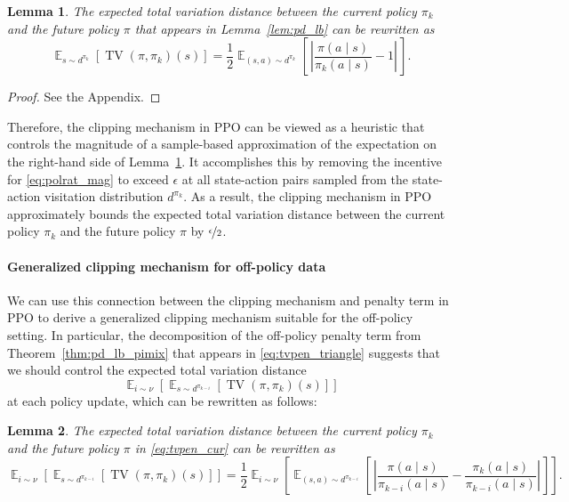 \documentclass{article}
\newtheorem{lemma}{Lemma}
\begin{document}
\begin{lemma}\label{lem:tv_polrat_pik}
The expected total variation distance between the current policy $\pi_k$ and the future policy $\pi$ that appears in Lemma~\ref{lem:pd_lb} can be rewritten as
\begin{equation}
\mathop{\mathbb{E}}_{s \sim d^{\pi_k}} \left[ \operatorname{TV}(\pi,\pi_k)(s) \right] = \frac{1}{2} \mathop{\mathbb{E}}_{(s,a) \sim d^{\pi_k}} \left[ \, \left| \frac{\pi(a \mid s)}{\pi_k(a \mid s)} - 1  \right| \, \right].
\end{equation}
\end{lemma}

\begin{proof}
See the Appendix.
\end{proof}

Therefore, the clipping mechanism in PPO can be viewed as a heuristic that controls the magnitude of a sample-based approximation of the expectation on the right-hand side of Lemma~\ref{lem:tv_polrat_pik}. It accomplishes this by removing the incentive for \eqref{eq:polrat_mag} to exceed $\epsilon$ at all state-action pairs sampled from the state-action visitation distribution $d^{\pi_k}$. As a result, the clipping mechanism in PPO approximately bounds the expected total variation distance between the current policy $\pi_k$ and the future policy $\pi$ by $\nicefrac{\epsilon}{2}$.

\paragraph{Generalized clipping mechanism for off-policy data}

We can use this connection between the clipping mechanism and penalty term in PPO to derive a generalized clipping mechanism suitable for the off-policy setting. In particular, the decomposition of the off-policy penalty term from Theorem~\ref{thm:pd_lb_pimix} that appears in \eqref{eq:tvpen_triangle} suggests that we should control the expected total variation distance
\begin{equation}\label{eq:tvpen_cur}
\mathop{\mathbb{E}}_{i \sim \nu} \left[ \mathop{\mathbb{E}}_{s \sim d^{\pi_{k-i}}} \left[ \operatorname{TV}(\pi,\pi_{k})(s) \right] \right]
\end{equation}
at each policy update, which can be rewritten as follows:

\begin{lemma}\label{lem:tv_polrat_pimix}
The expected total variation distance between the current policy $\pi_k$ and the future policy $\pi$ in \eqref{eq:tvpen_cur} can be rewritten as
\begin{equation}
\mathop{\mathbb{E}}_{i \sim \nu} \left[ \mathop{\mathbb{E}}_{s \sim d^{\pi_{k-i}}} \left[ \operatorname{TV}(\pi,\pi_{k})(s) \right] \right] = \frac{1}{2} \mathop{\mathbb{E}}_{i \sim \nu} \left[ \mathop{\mathbb{E}}_{(s,a) \sim d^{\pi_{k-i}}} \left[ \, \left| \frac{\pi(a \mid s)}{\pi_{k-i}(a \mid s)} - \frac{\pi_k(a \mid s)}{\pi_{k-i}(a \mid s)}  \right| \, \right] \right].
\end{equation}
\end{lemma}
\end{document}
